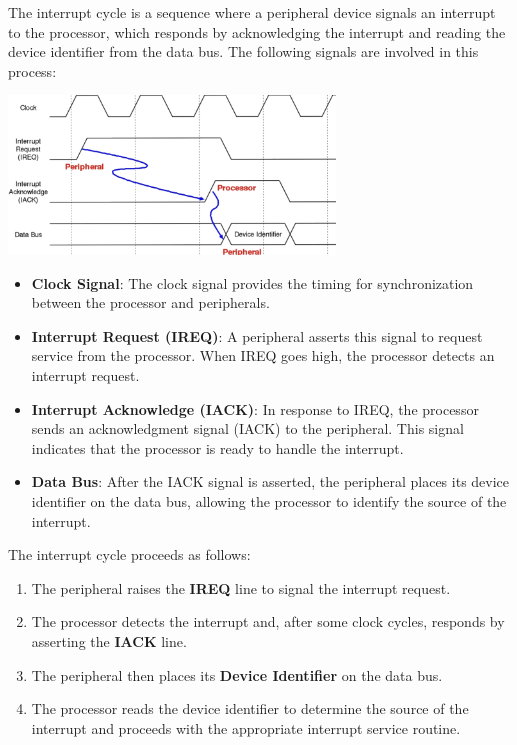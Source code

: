 The interrupt cycle is a sequence where a peripheral device signals an interrupt to the processor, which responds by acknowledging the interrupt and reading the device identifier from the data bus. The following signals are involved in this process:
\begin{center}
    \includegraphics[width=0.65\textwidth]{chapters/chapter2c/images/interrupt.png}
\end{center}
\begin{itemize}
    \item \textbf{Clock Signal}: The clock signal provides the timing for synchronization between the processor and peripherals.
    
    \item \textbf{Interrupt Request (IREQ)}: A peripheral asserts this signal to request service from the processor. When IREQ goes high, the processor detects an interrupt request.
    
    \item \textbf{Interrupt Acknowledge (IACK)}: In response to IREQ, the processor sends an acknowledgment signal (IACK) to the peripheral. This signal indicates that the processor is ready to handle the interrupt.
    
    \item \textbf{Data Bus}: After the IACK signal is asserted, the peripheral places its device identifier on the data bus, allowing the processor to identify the source of the interrupt.
\end{itemize}

The interrupt cycle proceeds as follows:
\begin{enumerate}
    \item The peripheral raises the \textbf{IREQ} line to signal the interrupt request.
    \item The processor detects the interrupt and, after some clock cycles, responds by asserting the \textbf{IACK} line.
    \item The peripheral then places its \textbf{Device Identifier} on the data bus.
    \item The processor reads the device identifier to determine the source of the interrupt and proceeds with the appropriate interrupt service routine.
\end{enumerate}

